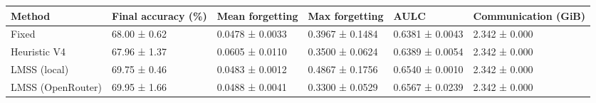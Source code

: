 \begin{tabular}{llllll}
\toprule
Method & Final accuracy (\%) & Mean forgetting & Max forgetting & AULC & Communication (GiB) \\
\midrule
Fixed & 68.00 ± 0.62 & 0.0478 ± 0.0033 & 0.3967 ± 0.1484 & 0.6381 ± 0.0043 & 2.342 ± 0.000 \\
Heuristic V4 & 67.96 ± 1.37 & 0.0605 ± 0.0110 & 0.3500 ± 0.0624 & 0.6389 ± 0.0054 & 2.342 ± 0.000 \\
LMSS (local) & 69.75 ± 0.46 & 0.0483 ± 0.0012 & 0.4867 ± 0.1756 & 0.6540 ± 0.0010 & 2.342 ± 0.000 \\
LMSS (OpenRouter) & 69.95 ± 1.66 & 0.0488 ± 0.0041 & 0.3300 ± 0.0529 & 0.6567 ± 0.0239 & 2.342 ± 0.000 \\
\bottomrule
\end{tabular}
